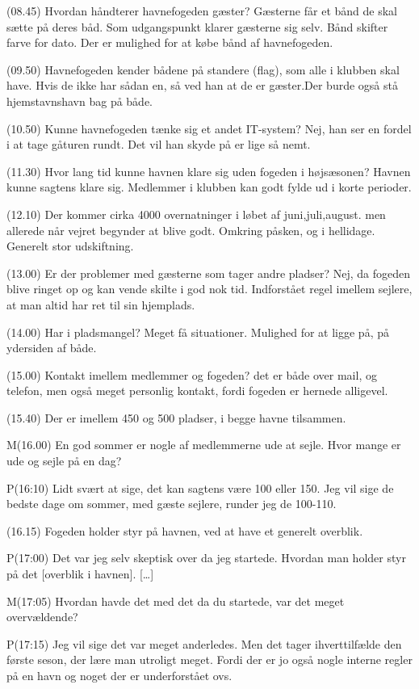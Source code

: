 \documentclass{article}
\begin{document}
(08.45) Hvordan håndterer havnefogeden gæster? Gæsterne får et bånd de skal sætte på deres båd. Som udgangspunkt klarer gæsterne sig selv. Bånd skifter farve for dato. Der er mulighed for at købe bånd af havnefogeden.

(09.50) Havnefogeden kender bådene på standere (flag), som alle i klubben skal have. Hvis de ikke har sådan en, så ved han at de er gæster.Der burde også stå hjemstavnshavn bag på både. 

(10.50) Kunne havnefogeden tænke sig et andet IT-system? Nej, han ser en fordel i at tage gåturen rundt. Det vil han skyde på er lige så nemt. 

(11.30) Hvor lang tid kunne havnen klare sig uden fogeden i højsæsonen? Havnen kunne sagtens klare sig. Medlemmer i klubben kan godt fylde ud i korte perioder.

(12.10) Der kommer cirka 4000 overnatninger i løbet af juni,juli,august. men allerede når vejret begynder at blive godt. Omkring påsken, og i hellidage. Generelt stor udskiftning.

(13.00) Er der problemer med gæsterne som tager andre pladser? Nej, da fogeden blive ringet op og kan vende skilte i god nok tid. Indforstået regel imellem sejlere, at man altid har ret til sin hjemplads.

(14.00) Har i pladsmangel? Meget få situationer. Mulighed for at ligge på, på ydersiden af både.

(15.00) Kontakt imellem medlemmer og fogeden? det er både over mail, og telefon, men også meget personlig kontakt, fordi fogeden er hernede alligevel.

(15.40) Der er imellem 450 og 500 pladser, i begge havne tilsammen.

M(16.00) En god sommer er nogle af medlemmerne ude at sejle. Hvor mange er ude og sejle på en dag?

P(16:10) Lidt svært at sige, det kan sagtens være 100 eller 150. Jeg vil sige de bedste dage om sommer, med gæste sejlere, runder jeg de 100-110.

(16.15) Fogeden holder styr på havnen, ved at have et generelt overblik.

P(17:00) Det var jeg selv skeptisk over da jeg startede. Hvordan man holder styr på det [overblik i havnen]. [\ldots]

M(17:05) Hvordan havde det med det da du startede, var det meget overvældende?

P(17:15) Jeg vil sige det var meget anderledes. Men det tager ihverttilfælde den første seson, der lære man utroligt meget. Fordi der er jo også nogle interne regler på en havn og noget der er underforstået ovs.
\end{document}
